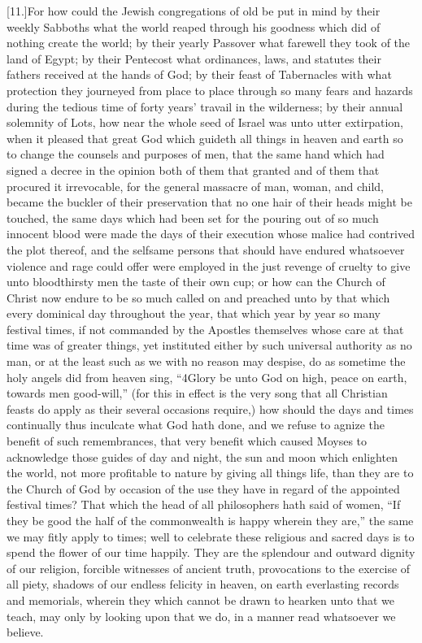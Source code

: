 [11.]For how could the Jewish congregations of old be put in mind by their weekly Sabboths what the world reaped through his goodness which did of nothing create the world; by their yearly Passover what farewell they took of the land of Egypt; by their Pentecost what ordinances, laws, and statutes their fathers received at the hands of God; by their feast of Tabernacles with what protection they journeyed from place to place through so many fears and hazards during the tedious time of forty years’ travail in the wilderness; by their annual solemnity of Lots, how near the whole seed of Israel was unto utter extirpation, when it pleased that great God which guideth all things in heaven and earth so to change the counsels and purposes of men, that the same hand which had signed a decree in the opinion both of them that granted and of them that procured it irrevocable, for the general massacre of man, woman, and child, became the buckler of their preservation that no one hair of their heads might be touched, the same days which had been set for the pouring out of so much innocent blood were made the days of their execution  whose malice had contrived the plot thereof, and the selfsame persons that should have endured whatsoever violence and rage could offer were employed in the just revenge of cruelty to give unto bloodthirsty men the taste of their own cup;
 or how can the Church of Christ now endure to be so much called on and preached unto by that which every dominical day throughout the year, that which year by year so many festival times, if not commanded by the Apostles themselves whose care at that time was of greater things, yet instituted either by such universal authority as no man, or at the least such as we with no reason may despise, do as sometime the holy angels did from heaven sing, “4Glory be unto God on high, peace on earth, towards men good-will,” (for this in effect is the very song that all Christian feasts do apply as their several occasions require,) how should the days and times continually thus inculcate what God hath done, and we refuse to agnize the benefit of such remembrances, that very benefit which caused Moyses to acknowledge those guides of day and night, the sun and moon which enlighten the world, not more profitable to nature by giving all things life, than they are to the Church of God by occasion of the use they have in regard of the appointed festival times? That which the head of all philosophers hath said of women, “If they be good the half of the commonwealth is happy wherein they are,” the same we may fitly apply to times; well to celebrate these religious and sacred days is to spend the flower of our time happily. They are the splendour and outward dignity of our religion, forcible witnesses of ancient truth,  provocations to the exercise of all piety,
 shadows of our endless felicity in heaven, on earth everlasting records and memorials, wherein they which cannot be drawn to hearken unto that we teach, may only by looking upon that we do, in a manner read whatsoever we believe.


